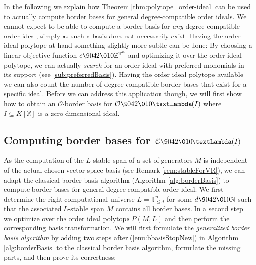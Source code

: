 \documentclass[11pt,oneside,english]{amsart}
\makeatletter
\numberwithin{equation}{section}
\numberwithin{figure}{section}
\theoremstyle{plain}
\theoremstyle{definition}
\theoremstyle{definition}
\theoremstyle{remark}
\theoremstyle{plain}
\theoremstyle{plain}
\theoremstyle{plain}
\theoremstyle{problem@}
\makeatother
\begin{document}
In the following we explain how Theorem \ref{thm:polytope=order-ideal}
can be used to actually compute border bases for general degree-compatible
order ideals. We cannot expect to be able to compute a border basis
for \emph{any} degree-compatible order ideal, simply as such a basis
does not necessarily exist. Having the order ideal polytope at hand
something slightly more subtle can be done: By choosing a linear objective
function $c{\9042\010}{\mathbb{Z}}^{{\mathbb{T}}^n}$ and optimizing it over the order ideal polytope,
we can actually \emph{search} for an order ideal with preferred monomials
in its support (see \autoref{sub:preferredBasis}). Having the
order ideal polytope available we can also count the number of degree-compatible
border bases that exist for a specific ideal.
Before we can address this application though, we will first show
how to obtain an ${\mathcal{O}}$-border basis for ${\mathcal{O}} {\9042\010} {\textLambda}(I)$
where $I \subseteq {K[\mathbb{X}]}$ is a zero-dimensional ideal. 

\subsection{\label{sub:ComputingBB}Computing border bases for ${\mathcal{O}} {\9042\010} {\textLambda}(I)$}

As the computation of the $L$-stable span of a set of generators
$M$ is independent of the actual chosen vector space basis (see Remark
\ref{rem:stableForVR}), we can adapt the classical border basis algorithm
(Algorithm \ref{alg:borderBasis}) to compute border bases for general
degree-compatible order ideal. We first determine the right computational
universe $L = {\mathbb{T}}^n_{\leq d}$ for some $d {\9042\010} {\mathbb{N}}$ such that the associated
$L$-stable span $M$ contains all border bases. In a second step we optimize over
the order ideal polytope $P(M,L)$ and then perform the corresponding basis
transformation. We will first formulate the \emph{generalized border basis
  algorithm} by adding two steps after (\ref{enu:bbasisStopNew}) in Algorithm
\ref{alg:borderBasis} to the classical border basis algorithm, formulate the
missing parts, and then prove its correctness:
\end{document}
